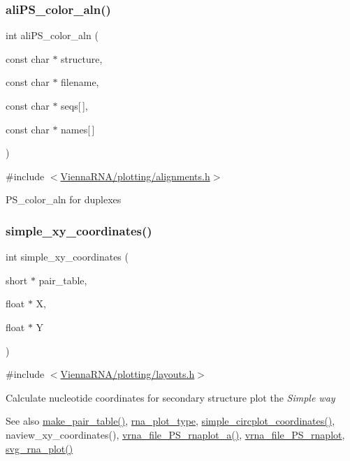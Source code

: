 \subsubsection{\texorpdfstring{ali\+P\+S\+\_\+color\+\_\+aln()}{aliPS\_color\_aln()}}
{\footnotesize\ttfamily int ali\+P\+S\+\_\+color\+\_\+aln (\begin{DoxyParamCaption}\item[{const char $\ast$}]{structure,  }\item[{const char $\ast$}]{filename,  }\item[{const char $\ast$}]{seqs\mbox{[}$\,$\mbox{]},  }\item[{const char $\ast$}]{names\mbox{[}$\,$\mbox{]} }\end{DoxyParamCaption})}



{\ttfamily \#include $<$\hyperlink{plotting_2alignments_8h}{Vienna\+R\+N\+A/plotting/alignments.\+h}$>$}

P\+S\+\_\+color\+\_\+aln for duplexes \mbox{\label{group__plotting__utils_gaf4b9173e7d3fd361c3c85e6def194123}} 
\subsubsection{\texorpdfstring{simple\+\_\+xy\+\_\+coordinates()}{simple\_xy\_coordinates()}}
{\footnotesize\ttfamily int simple\+\_\+xy\+\_\+coordinates (\begin{DoxyParamCaption}\item[{short $\ast$}]{pair\+\_\+table,  }\item[{float $\ast$}]{X,  }\item[{float $\ast$}]{Y }\end{DoxyParamCaption})}



{\ttfamily \#include $<$\hyperlink{layouts_8h}{Vienna\+R\+N\+A/plotting/layouts.\+h}$>$}



Calculate nucleotide coordinates for secondary structure plot the {\itshape Simple way} 

\begin{DoxySeeAlso}{See also}
\hyperlink{group__struct__utils__deprecated_ga89c32307ee50a0026f4a3131fac0845a}{make\+\_\+pair\+\_\+table()}, \hyperlink{group__plotting__utils_ga5964c4581431b098b80027d6e14dcdd4}{rna\+\_\+plot\+\_\+type}, \hyperlink{group__plotting__utils_gac4ea13d35308f09940178d2b05a248c2}{simple\+\_\+circplot\+\_\+coordinates()}, naview\+\_\+xy\+\_\+coordinates(), \hyperlink{group__plotting__utils_ga139a31dd0ba9fc6612431f67de901c31}{vrna\+\_\+file\+\_\+\+P\+S\+\_\+rnaplot\+\_\+a()}, \hyperlink{group__plotting__utils_gabdc8f6548ba4a3bc3cd868ccbcfdb86a}{vrna\+\_\+file\+\_\+\+P\+S\+\_\+rnaplot}, \hyperlink{group__plotting__utils_gae7853539b5df98f294b4af434e979304}{svg\+\_\+rna\+\_\+plot()}
\end{DoxySeeAlso}

